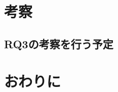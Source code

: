 \documentclass[T,J]{fose} %
\begin{document}
\section{考察}\label{sec:discussion}

\subsection{RQ3の考察を行う予定}




\section{おわりに}\label{sec:conclusion}




\end{document}
